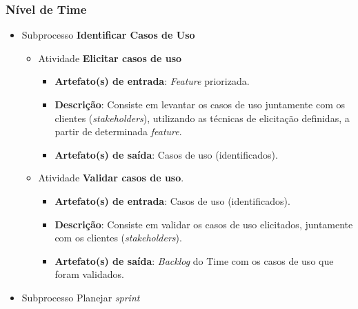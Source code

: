 
  \subsubsection{Nível de Time}
    
    \begin{itemize}
	
     \item Subprocesso \textbf{Identificar Casos de Uso}
	
	\begin{itemize}
	  \item Atividade \textbf{Elicitar casos de uso}
	      
	      \begin{itemize}
		  \item \textbf{Artefato(s) de entrada}: \textit{Feature} priorizada.
		  
		  \item \textbf{Descrição}: Consiste em levantar os casos de uso juntamente com os clientes
		    (\textit{stakeholders}), utilizando as técnicas de elicitação definidas,  a partir de determinada
		    \textit{feature}.
		  
		  \item \textbf{Artefato(s) de saída}: Casos de uso (identificados).
		    
		\end{itemize}
	    
	    \item Atividade \textbf{Validar casos de uso}.
	    
		\begin{itemize}
		  \item \textbf{Artefato(s) de entrada}: Casos de uso (identificados).
		  
		  \item \textbf{Descrição}: Consiste em validar os casos de uso elicitados, juntamente com os
		    clientes (\textit{stakeholders}).
		  
		  \item \textbf{Artefato(s) de saída}: \textit{Backlog} do Time com os casos de uso que foram validados.
			
		\end{itemize}
		
	\end{itemize} %
	    
     \item Subprocesso Planejar \textit{sprint}
	
	\begin{itemize}
	    

\end{itemize}
\end{itemize}
